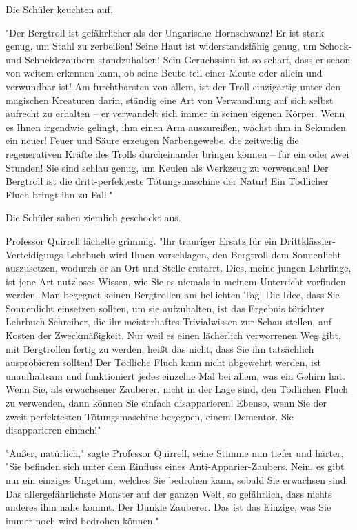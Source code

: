 {Die Schüler keuchten auf.

"Der Bergtroll ist gefährlicher als der Ungarische Hornschwanz! Er ist stark genug, um Stahl zu zerbeißen! Seine Haut ist widerstandsfähig genug, um Schock- und Schneidezaubern standzuhalten! Sein Geruchssinn ist so scharf, dass er schon von weitem erkennen kann, ob seine Beute teil einer Meute oder allein und verwundbar ist! Am furchtbarsten von allem, ist der Troll einzigartig unter den magischen Kreaturen darin, ständig eine Art von Verwandlung auf sich selbst aufrecht zu erhalten -- er verwandelt sich immer in seinen eigenen Körper. Wenn es Ihnen irgendwie gelingt, ihm einen Arm auszureißen, wächst ihm in Sekunden ein neuer! Feuer und Säure erzeugen Narbengewebe, die zeitweilig die regenerativen Kräfte des Trolls durcheinander bringen können -- für ein oder zwei Stunden! Sie sind schlau genug, um Keulen als Werkzeug zu verwenden! Der Bergtroll ist die dritt-perfekteste Tötungsmaschine der Natur! Ein Tödlicher Fluch bringt ihn zu Fall."

Die Schüler sahen ziemlich geschockt aus.

Professor Quirrell lächelte grimmig. "Ihr trauriger Ersatz für ein Drittklässler-Verteidigungs-Lehrbuch wird Ihnen vorschlagen, den Bergtroll dem Sonnenlicht auszusetzen, wodurch er an Ort und Stelle erstarrt. Dies, meine jungen Lehrlinge, ist jene Art nutzloses Wissen, wie Sie es niemals in meinem Unterricht vorfinden werden. Man begegnet keinen Bergtrollen am hellichten Tag! Die Idee, dass Sie Sonnenlicht einsetzen sollten, um sie aufzuhalten, ist das Ergebnis törichter Lehrbuch-Schreiber, die ihr meisterhaftes Trivialwissen zur Schau stellen, auf Kosten der Zweckmäßigkeit. Nur weil es einen lächerlich verworrenen Weg gibt, mit Bergtrollen fertig zu werden, heißt das nicht, dass Sie ihn tatsächlich ausprobieren sollten! Der Tödliche Fluch kann nicht abgewehrt werden, ist unaufhaltsam und funktioniert jedes einzelne Mal bei allem, was ein Gehirn hat. Wenn Sie, als erwachsener Zauberer, nicht in der Lage sind, den Tödlichen Fluch zu verwenden, dann können Sie einfach disapparieren! Ebenso, wenn Sie der zweit-perfektesten Tötungsmaschine begegnen, einem Dementor. Sie disapparieren einfach!"

"Außer, natürlich," sagte Professor Quirrell, seine Stimme nun tiefer und härter, "Sie befinden sich unter dem Einfluss eines Anti-Apparier-Zaubers. Nein, es gibt nur ein einziges Ungetüm, welches Sie bedrohen kann, sobald Sie erwachsen sind. Das allergefährlichste Monster auf der ganzen Welt, so gefährlich, dass nichts anderes ihm nahe kommt. Der Dunkle Zauberer. Das ist das Einzige, was Sie immer noch wird bedrohen können."

}
